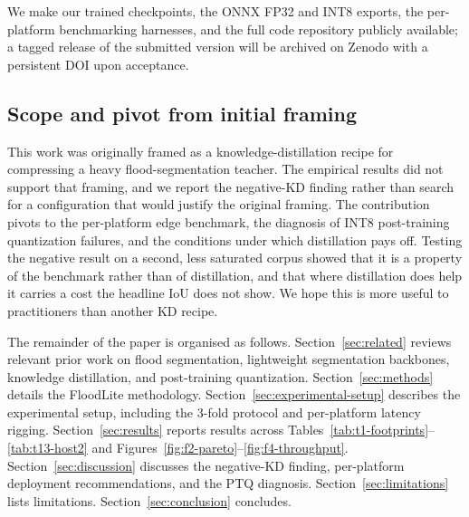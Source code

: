 We make our trained checkpoints, the ONNX FP32 and INT8 exports, the per-platform benchmarking harnesses, and the full code repository publicly available; a tagged release of the submitted version will be archived on Zenodo with a persistent DOI upon acceptance.

\subsection{Scope and pivot from initial framing}
\label{sec:scope-pivot}

This work was originally framed as a knowledge-distillation recipe for compressing a heavy flood-segmentation teacher. The empirical results did not support that framing, and we report the negative-KD finding rather than search for a configuration that would justify the original framing. The contribution pivots to the per-platform edge benchmark, the diagnosis of INT8 post-training quantization failures, and the conditions under which distillation pays off. Testing the negative result on a second, less saturated corpus showed that it is a property of the benchmark rather than of distillation, and that where distillation does help it carries a cost the headline IoU does not show. We hope this is more useful to practitioners than another KD recipe.

The remainder of the paper is organised as follows. Section~\ref{sec:related} reviews relevant prior work on flood segmentation, lightweight segmentation backbones, knowledge distillation, and post-training quantization. Section~\ref{sec:methods} details the FloodLite methodology. Section~\ref{sec:experimental-setup} describes the experimental setup, including the 3-fold protocol and per-platform latency rigging. Section~\ref{sec:results} reports results across Tables~\ref{tab:t1-footprints}--\ref{tab:t13-host2} and Figures~\ref{fig:f2-pareto}--\ref{fig:f4-throughput}. Section~\ref{sec:discussion} discusses the negative-KD finding, per-platform deployment recommendations, and the PTQ diagnosis. Section~\ref{sec:limitations} lists limitations. Section~\ref{sec:conclusion} concludes.
